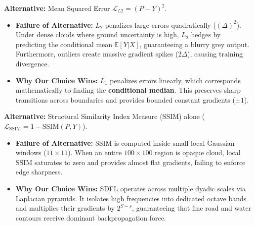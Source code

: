 \documentclass[11pt,a4paper]{article}
\begin{document}
\begin{tcolorbox}[colback=white,colframe=primary,title=\textbf{1. Why $L_1$ (MAE) over $L_2$ (MSE) for Pillar 1?}]
\textbf{Alternative:} Mean Squared Error $\mathcal{L}_{L2} = (P - Y)^2$.
\begin{itemize}[leftmargin=1.2em, itemsep=0.2em]
    \item \textbf{Failure of Alternative:} $L_2$ penalizes large errors quadratically ($(\Delta)^2$). Under dense clouds where ground uncertainty is high, $L_2$ hedges by predicting the conditional mean $\mathbb{E}[Y|X]$, guaranteeing a blurry grey output. Furthermore, outliers create massive gradient spikes ($2\Delta$), causing training divergence.
    \item \textbf{Why Our Choice Wins:} $L_1$ penalizes errors linearly, which corresponds mathematically to finding the \textbf{conditional median}. This preserves sharp transitions across boundaries and provides bounded constant gradients ($\pm 1$).
\end{itemize}
\end{tcolorbox}

\begin{tcolorbox}[colback=white,colframe=secondary,title=\textbf{2. Why Scale-Decoupled Frequency Loss (SDFL) over Standard SSIM Alone for Pillar 2?}]
\textbf{Alternative:} Structural Similarity Index Measure (SSIM) alone ($\mathcal{L}_{\text{SSIM}} = 1 - \text{SSIM}(P, Y)$).
\begin{itemize}[leftmargin=1.2em, itemsep=0.2em]
    \item \textbf{Failure of Alternative:} SSIM is computed inside small local Gaussian windows ($11 \times 11$). When an entire $100 \times 100$ region is opaque cloud, local SSIM saturates to zero and provides almost flat gradients, failing to enforce edge sharpness.
    \item \textbf{Why Our Choice Wins:} SDFL operates across multiple dyadic scales via Laplacian pyramids. It isolates high frequencies into dedicated octave bands and multiplies their gradients by $2^{S-s}$, guaranteeing that fine road and water contours receive dominant backpropagation force.
\end{itemize}
\end{tcolorbox}
\end{document}
